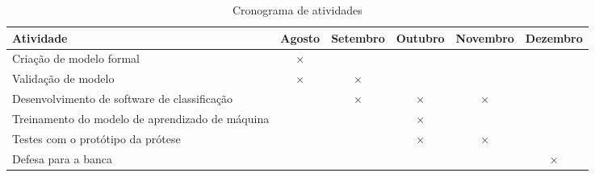\begin{table}[htbp]
  \centering
  \caption{Cronograma de atividades}
  \label{tab:cronograma}
  \begin{tabularx}{\textwidth}{|X|c|c|c|c|c|}
    \hline
    \textbf{Atividade} & \textbf{Agosto} & \textbf{Setembro} & \textbf{Outubro} & \textbf{Novembro} & \textbf{Dezembro} \\
    \hline
    Criação de modelo formal & \(\times\) & & & & \\
    \hline
    Validação de modelo & \(\times\) & \(\times\)  &  & & \\
    \hline
    Desenvolvimento de software de classificação & & \(\times\) & \(\times\) & \(\times\) & \\
    \hline
    Treinamento do modelo de aprendizado de máquina & & & \(\times\) & &  \\
    \hline
    Testes com o protótipo da prótese & & & \(\times\) & \(\times\) &  \\
    \hline
    Defesa para a banca & & & & & \(\times\)  \\
    \hline
  \end{tabularx}
\end{table}